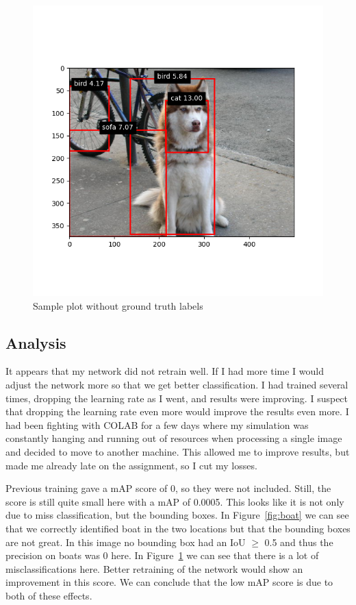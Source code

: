 \documentclass{article}
\begin{document}
\begin{figure}
\centering
\includegraphics[width=\textwidth]{prevExample.png}
\caption{Sample plot without ground truth labels}
\label{fig:dog}
\end{figure}

\subsection{Analysis}
It appears that my network did not retrain well. If I had more time I would
adjust the network more so that we get better classification. I had trained
several times, dropping the learning rate as I went, and results were improving.
I suspect that dropping the learning rate even more would improve the results
even more. I had been fighting with COLAB for a few days where my simulation was
constantly hanging and running out of resources when processing a single image
and decided to move to another machine. This allowed me to improve results, but
made me already late on the assignment, so I cut my losses. 

Previous training gave a mAP score of 0, so they were not included. Still, the
score is still quite small here with a mAP of 0.0005. This looks like it is not
only due to miss classification, but the bounding boxes. In
Figure~\ref{fig:boat} we can see that we correctly identified boat in the two
locations but that the bounding boxes are not great. In this image no bounding
box had an IoU $\geq$ 0.5 and thus the precision on boats was 0 here. In
Figure~\ref{fig:dog} we can see that there is a lot of misclassifications here.
Better retraining of the network would show an improvement in this score. We can
conclude that the low mAP score is due to both of these effects. 
\end{document}
